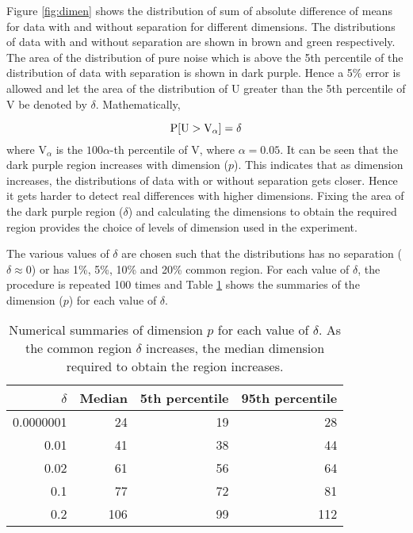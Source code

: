 Figure \ref{fig:dimen} shows the distribution of sum of absolute difference of means for data with and without separation for different dimensions. The distributions of data with and without separation are shown in brown and green respectively. The area of the distribution of pure noise which is above the 5th percentile of the distribution of data with separation is shown in dark purple.  Hence a 5\% error is allowed and let the area of the distribution of U greater than the 5th percentile of V be denoted by $\delta$. Mathematically, 

$$\hbox{P}[\mbox{U} > \mbox{V}_{\alpha}] = \delta$$ where $\mbox{V}_{\alpha}$ is the $100\alpha$-th percentile of V, where $\alpha = 0.05$.  It can be seen that the dark purple region increases with dimension ($p$). This indicates that as dimension increases, the distributions of data with or without separation gets closer. Hence it gets harder to detect real differences with higher dimensions. Fixing the area of the dark purple region ($\delta$) and calculating the dimensions to obtain the required region provides the choice of levels of dimension used in the experiment.


The various values of $\delta$ are chosen such that the distributions has no separation ($\delta \approx 0$) or has 1\%, 5\%, 10\% and 20\% common region. For each value of $\delta$, the procedure is repeated 100 times and Table \ref{tab:dimen} shows the summaries of the dimension ($p$) for each value of $\delta$.

\begin{table}[htbp]
\begin{center}
\caption{Numerical summaries of dimension $p$ for each value of $\delta$. As the common region $\delta$ increases, the median dimension required to obtain the region increases.}
\begin{tabular}{rrrr}
  \hline
  \hline
  $\delta$ & Median & 5th percentile & 95th percentile \\
  \hline
  0.0000001 & 24 & 19 & 28 \\
      0.01 & 41 & 38 & 44\\
   0.02 & 61 & 56 & 64 \\
     0.1 & 77 & 72 & 81\\   
     0.2 & 106 & 99 & 112\\ 
      \hline
\end{tabular}
\label{tab:dimen}
\end{center}
\end{table}

